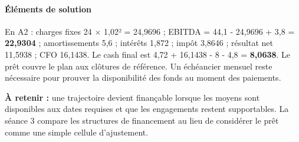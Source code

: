 \documentclass[12pt,a4paper]{article}
\begin{document}
\paragraph{Éléments de solution}
En A2 : charges fixes 24 $\times$ 1,02² = 24,9696 ; EBITDA = 44,1 - 24,9696 + 3,8 = \textbf{22,9304} ; amortissements 5,6 ; intérêts 1,872 ; impôt 3,8646 ; résultat net 11,5938 ; CFO 16,1438. Le cash final est 4,72 + 16,1438 - 8 - 4,8 = \textbf{8,0638}. Le prêt couvre le plan aux clôtures de référence. Un échéancier mensuel reste nécessaire pour prouver la disponibilité des fonds au moment des paiements.


\textbf{À retenir :} une trajectoire devient finançable lorsque les moyens sont disponibles aux dates requises et que les engagements restent supportables. La séance 3 compare les structures de financement au lieu de considérer le prêt comme une simple cellule d’ajustement.
\end{document}
